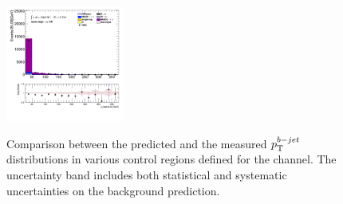 \begin{figure}[!htp]
\begin{center}
			\includegraphics[width=0.35\textwidth]{chapters/chapter6_HPlus/images/taulep/bjet_0_pt_SS_TAUMU.png} \\
			\end{center}
			\caption{
			Comparison between the predicted and the measured $p_{\text{T}}^{b-jet}$ distributions in various control regions defined for the \taulep channel. The uncertainty band includes both statistical and systematic uncertainties on the background prediction. 
			}
			\label{fig:bkg-pt-bjet-taulep}
		\end{figure}

